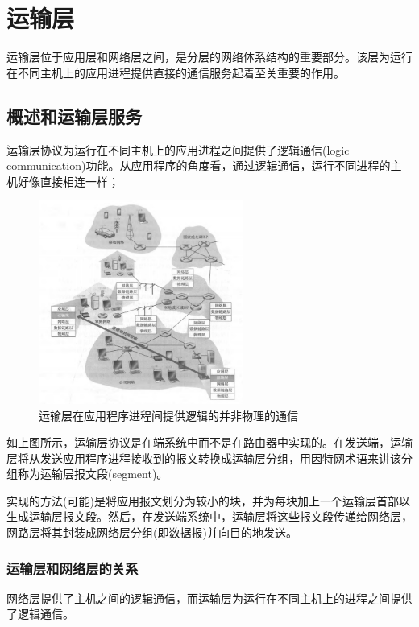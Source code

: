 \chapter{运输层}

    运输层位于应用层和网络层之间，是分层的网络体系结构的重要部分。该层为运行在不同主机上的应用进程提供直接的通信服务起着至关重要的作用。

\section{概述和运输层服务}

    运输层协议为运行在不同主机上的应用进程之间提供了逻辑通信(logic communication)功能。从应用程序的角度看，通过逻辑通信，运行不同进程的主机好像直接相连一样；

\begin{figure}[!htbp]
    \centering
    \includegraphics[width=0.6\textwidth]{image/chapter03/运输层.png}
    \caption{运输层在应用程序进程间提供逻辑的并非物理的通信}
\end{figure}

    如上图所示，运输层协议是在端系统中而不是在路由器中实现的。在发送端，运输层将从发送应用程序进程接收到的报文转换成运输层分组，用因特网术语来讲该分组称为运输层报文段(segment)。

    实现的方法(可能)是将应用报文划分为较小的块，并为每块加上一个运输层首部以生成运输层报文段。然后，在发送端系统中，运输层将这些报文段传递给网络层，网路层将其封装成网络层分组(即数据报)并向目的地发送。

\subsection{运输层和网络层的关系}

    网络层提供了主机之间的逻辑通信，而运输层为运行在不同主机上的进程之间提供了逻辑通信。

